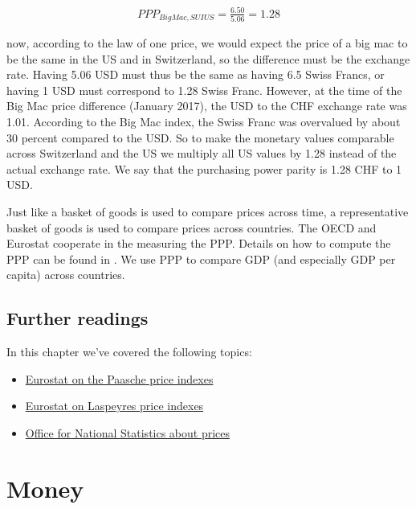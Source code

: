 \documentclass[
]{book}
\begin{document}
\begin{align}
    PPP_{BigMac,SUIUS}=\frac{6.50}{5.06}=1.28
\end{align}

now, according to the law of one price, we would expect the price of a big mac to be the same in the US and in Switzerland, so the difference must be the exchange rate. Having 5.06 USD must thus be the same as having 6.5 Swiss Francs, or having 1 USD must correspond to 1.28 Swiss Franc. However, at the time of the Big Mac price difference (January 2017), the USD to the CHF exchange rate was 1.01. According to the Big Mac index, the Swiss Franc was overvalued by about 30 percent compared to the USD. So to make the monetary values comparable across Switzerland and the US we multiply all US values by 1.28 instead of the actual exchange rate. We say that the purchasing power parity is 1.28 CHF to 1 USD.

Just like a basket of goods is used to compare prices across time, a representative basket of goods is used to compare prices across countries. The OECD and Eurostat cooperate in the measuring the PPP. Details on how to compute the PPP can be found in \citep{ppp}. We use PPP to compare GDP (and especially GDP per capita) across countries.

\hypertarget{further-readings-6}{%
\section{Further readings}\label{further-readings-6}}

In this chapter we've covered the following topics:

\begin{itemize}
\item
  \href{https://ec.europa.eu/eurostat/statistics-explained/index.php?title=Glossary:Paasche_price_index}{Eurostat on the Paasche price indexes}
\item
  \href{https://ec.europa.eu/eurostat/statistics-explained/index.php?title=Glossary:Laspeyres_price_index}{Eurostat on Laspeyres price indexes}
\item
  \href{https://www.ons.gov.uk/economy/inflationandpriceindices/articles/consumerpriceindicesabriefguide/2016}{Office for National Statistics about prices}
\end{itemize}

\hypertarget{money}{%
\chapter{Money}\label{money}}
\end{document}
